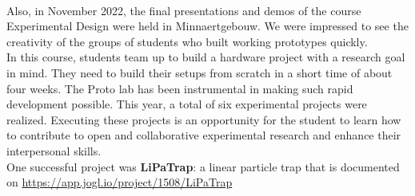 \documentclass{report}
\begin{document}
\clearpage
\begin{figure}
    \centering
\end{figure}
\clearpage

 \\

Also, in November 2022, the final presentations and demos of the course Experimental Design were held in Minnaertgebouw. We were impressed to see the creativity of the groups of students who built working prototypes quickly.  \\

In this course, students team up to build a hardware project with a research goal in mind. They need to build their setups from scratch in a short time of about four weeks. The Proto lab has been instrumental in making such rapid development possible. This year, a total of six experimental projects were realized.
Executing these projects is an opportunity for the student to learn how to contribute to open and collaborative experimental research and enhance their interpersonal skills. \\ 

One successful project was \textbf{LiPaTrap}: a linear particle trap that is documented on \url{https://app.jogl.io/project/1508/LiPaTrap}


\clearpage
\begin{figure}
    \centering
\end{figure}
\clearpage
\end{document}
